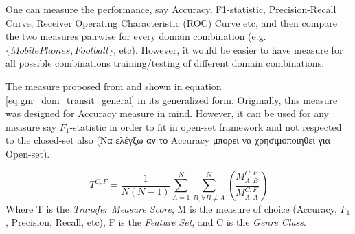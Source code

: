 One can measure the performance, say Accuracy, F1-statistic, Precision-Recall Curve,  Receiver Operating Characteristic (ROC) Curve etc, and then compare the two measures pairwise for every domain combination (e.g. $\{Mobile Phones, Football\}$, etc). However, it would be easier to have measure for all possible combinations training/testing of different domain combinations. 

The measure proposed from \parencite{finn2006learning} and shown in equation \ref{eq:gnr_dom_transit_general} in its generalized form. Originally, this measure was designed for Accuracy measure in mind. However, it can be used for any measure say $F_{1}$-statistic in order to fit in open-set framework and not respected to the closed-set also (Να ελέγξω αν το Accuracy μπορεί να χρησιμοποιηθεί για Open-set). 

\begin{equation} \label{eq:office_doc_ensemble}
	T^{C,F} = \frac{1}{N(N-1)} \sum_{A=1}^{N} \sum_{B, \forall B \neq A}^{N} \left(  \frac{M^{C,F}_{A,B}}{M^{C,F}_{A,A}} \right)
    \end{equation}
Where T is the \textit{Transfer Measure Score}, M is the measure of choice (Accuracy, $F_1$, Precision, Recall, etc), F is the \textit{Feature Set}, and C is the \textit{Genre Class}. 
























